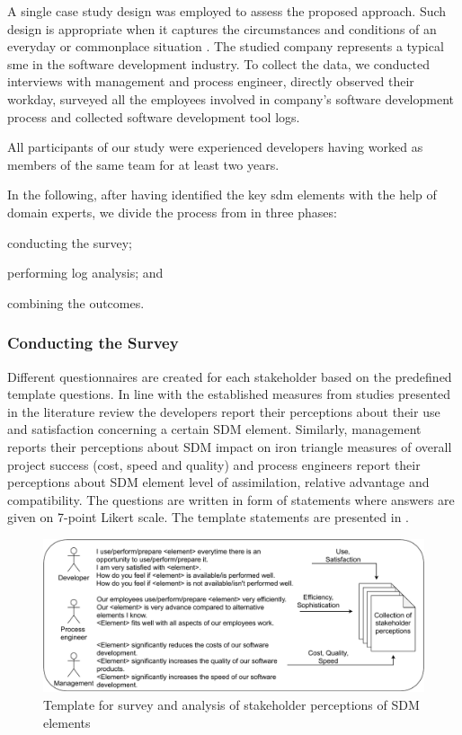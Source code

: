 A single case study design was employed to assess the proposed approach. Such design is appropriate when it captures the circumstances and conditions of an everyday or commonplace situation \citep{yin2017case}. The studied company represents a typical \gls{sme} in the software development industry. To collect the data, we conducted interviews with management and process engineer, directly observed their workday, surveyed all the employees involved in company’s software development process and collected software development tool logs. 

All participants of our study were experienced developers having worked as members of the same team for at least two years. 

In the following, after having identified the key \gls{sdm} elements with the help of domain experts, we divide the process from  in three phases: 
\begin{inparaenum}[\itshape i)]
	\item conducting the survey;
	\item performing log analysis; and
	\item combining the outcomes.
\end{inparaenum}

\subsubsection{Conducting the Survey}

Different questionnaires are created for each stakeholder based on the predefined template questions. In line with the established measures from studies presented in the literature review the developers report their perceptions about their use and satisfaction concerning a certain SDM element. Similarly, management reports their perceptions about SDM impact on iron triangle measures of overall project success (cost, speed and quality) and process engineers report their perceptions about SDM element level of assimilation, relative advantage and compatibility. The questions are written in form of statements where answers are given on 7-point Likert scale. The template statements are presented in . 

\begin{figure}
	\centering
	\includegraphics[width=\linewidth]{figures/SurveyMethod}
	\caption[Survey templates used for gathering stakeholders perceptions]{Template for survey and analysis of stakeholder perceptions of SDM elements}
	\label{fig:surveymethod}
\end{figure}


